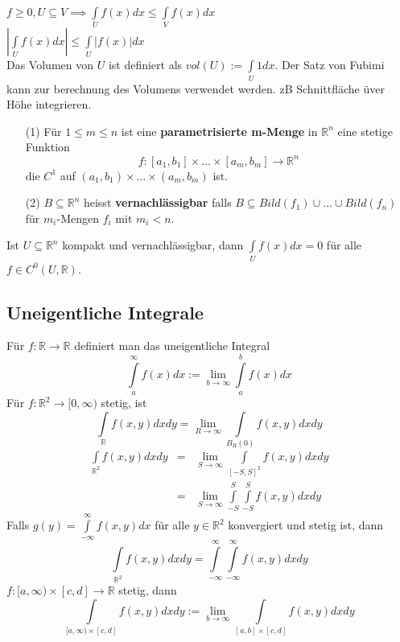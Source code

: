     $f\geq0,U\subseteq V\implies\int\limits_Uf(x)dx\leq\int\limits_Vf(x)dx$\\
    $\left|\int\limits_Uf(x)dx\right|\leq\int\limits_U\left|f(x)\right|dx$\\
    Das Volumen von $U$ ist definiert als $vol(U):=\int\limits_U1dx$. Der Satz von
    Fubimi kann zur berechnung des Volumens verwendet werden. zB Schnittfläche
    üver Höhe integrieren.\\
    \begin{enumerate}
      \item[(1)] Für $1\leq m\leq n$ ist eine \textbf{parametrisierte m-Menge} 
        in $\mathbb R^n$ eine stetige Funktion
        $$f:[a_1,b_1]\times\dots\times[a_m,b_m]\rightarrow\mathbb R^n$$ die
        $C^1$ auf $(a_1,b_1)\times\dots\times(a_m,b_m)$ ist.
      \item[(2)] $B\subseteq\mathbb R^n$ heisst \textbf{vernachlässigbar} falls
        $B\subseteq Bild(f_1)\cup\dots\cup Bild(f_n)$ für $m_i$-Mengen $f_i$ mit
        $m_i<n$.
    \end{enumerate}
    Ist $U\subseteq\mathbb R^n$ kompakt und vernachlässigbar, dann
    $\int\limits_{U}f(x)dx=0$ für alle $f\in C^0(U,\mathbb R)$.\\
\subsection{Uneigentliche Integrale}
  Für $f:\mathbb R\rightarrow\mathbb R$ definiert man das uneigentliche Integral
  $$\int\limits_a^\infty
  f(x)dx:=\lim\limits_{b\rightarrow\infty}\int\limits_a^bf(x)dx$$
    Für $f:\mathbb R^2\rightarrow[0,\infty)$ stetig, ist $$\int\limits_{\mathbb
    R}f(x,y)dxdy=\lim\limits_{R\rightarrow\infty}\int\limits_{B_R(0)}f(x,y)dxdy$$
    $$\begin{array}{lcl}
      \int\limits_{\mathbb R^2}f(x,y)dxdy &=&
      \lim\limits_{S\rightarrow\infty}\int\limits_{[-S,S]^2}f(x,y)dxdy\\
      &=&\lim\limits_{S\rightarrow\infty}\int\limits_{-S}^S\int\limits_{-S}^Sf(x,y)dxdy
    \end{array}$$
    Falls $g(y)=\int\limits_{-\infty}^\infty f(x,y)dx$ für alle $y\in\mathbb
    R^2$ konvergiert und stetig ist, dann $$\int\limits_{\mathbb
    R^2}f(x,y)dxdy=\int\limits_{-\infty}^\infty\int\limits_{-\infty}^\infty
    f(x,y)dxdy$$
      $f:[a,\infty)\times[c,d]\rightarrow\mathbb R$ stetig, dann
      $$\int\limits_{[a,\infty)\times[c,d]}f(x,y)dxdy:=\lim\limits_{b\rightarrow\infty}
      \int\limits_{[a,b]\times[c,d]}f(x,y)dxdy$$
